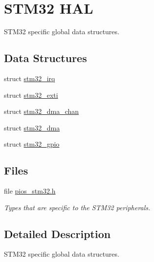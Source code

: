 \hypertarget{group___p_i_o_s___s_t_m32}{\section{\-S\-T\-M32 \-H\-A\-L}
\label{group___p_i_o_s___s_t_m32}
}


\-S\-T\-M32 specific global data structures.  


\subsection*{\-Data \-Structures}
\begin{DoxyCompactItemize}
\item 
struct \hyperlink{structstm32__irq}{stm32\-\_\-irq}
\item 
struct \hyperlink{structstm32__exti}{stm32\-\_\-exti}
\item 
struct \hyperlink{structstm32__dma__chan}{stm32\-\_\-dma\-\_\-chan}
\item 
struct \hyperlink{structstm32__dma}{stm32\-\_\-dma}
\item 
struct \hyperlink{structstm32__gpio}{stm32\-\_\-gpio}
\end{DoxyCompactItemize}
\subsection*{\-Files}
\begin{DoxyCompactItemize}
\item 
file \hyperlink{pios__stm32_8h}{pios\-\_\-stm32.\-h}
\begin{DoxyCompactList}\small\item\em \-Types that are specific to the \-S\-T\-M32 peripherals. \end{DoxyCompactList}\end{DoxyCompactItemize}


\subsection{\-Detailed \-Description}
\-S\-T\-M32 specific global data structures. 